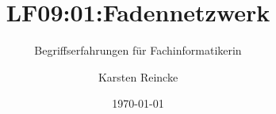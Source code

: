 \documentclass[]{beamer}
\title{LF09:01:Fadennetzwerk}
\subtitle{Begriffserfahrungen für Fachinformatikerin}
\institute[GS-LDK]{Gewerbliche Schulen Dillenburg}
\author{Karsten Reincke}
\date{\today}
\def\cfgGl{../../../cfg.gl/}
\begin{document}

\begin{frame}
  \titlepage

  
\end{frame}






\logo{}
\newpage



%
\end{document}
